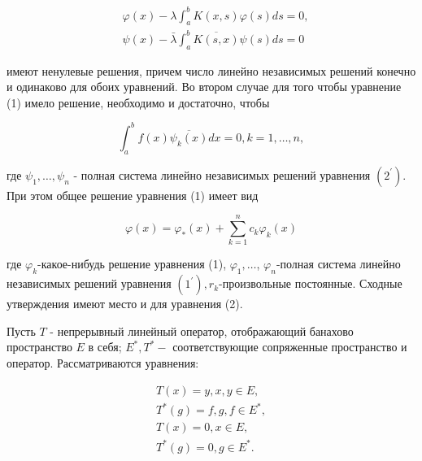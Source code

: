 \documentclass[10pt]{article}
\begin{document}
\[

\begin{aligned}

& \varphi(x)-\lambda \int_{a}^{b} K(x, s) \varphi(s) d s=0, \\

& \psi(x)-\bar{\lambda} \int_{a}^{b} \overline{K(s, x)} \psi(s) d s=0

\end{aligned}

\]



имеют ненулевые решения, причем число линейно независимых решений конечно и одинаково для обоих уравнений. Во втором случае для того чтобы уравнение (1) имело решение, необходимо и достаточно, чтобы



\[

\int_{a}^{b} f(x) \overline{\psi_{k}(x)} d x=0, k=1, \ldots, n,

\]



где $\psi_{1}, \ldots, \psi_{n}$ - полная система линейно независимых решений уравнения $\left(2^{\prime}\right)$. При этом общее решение уравнения (1) имеет вид



\[

\varphi(x)=\varphi_{*}(x)+\sum_{k=1}^{n} c_{k} \varphi_{k}(x)

\]



где $\varphi_{k}$-какое-нибудь решение уравнения (1), $\varphi_{1}, \ldots$, $\varphi_{n}$-полная система линейно независимых решений уравнения $\left(1^{\prime}\right), r_{k}$-произвольные постоянные. Сходные утверждения имеют место и для уравнения (2).



Пусть $T$ - непрерывный линейный оператор, отображающий банахово пространство $E$ в себя; $E^{*}, T^{*}-$ соответствующие сопряженные пространство и оператор. Рассматриваются уравнения:



\[

\begin{gathered}

T(x)=y, x, y \in E, \\

T^{*}(g)=f, g, f \in E^{*}, \\

T(x)=0, x \in E, \\

T^{*}(g)=0, g \in E^{*} .

\end{gathered}

\]
\end{document}
